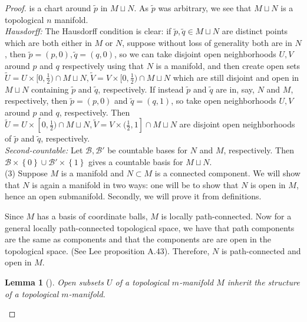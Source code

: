 \documentclass[reqno]{amsart}
\newtheorem{lemma}[theorem]{Lemma}
\theoremstyle{definition}
\theoremstyle{remark}
\begin{document}
\begin{proof}
is a chart around $\tilde{p}$ in
$M \sqcup N$. As $\tilde{p}$ was arbitrary,
we see that $M \sqcup N$ is a topological
$n$ manifold.\\
\linebreak
\textit{Hausdorff:} The Hausdorff condition is
clear: if $\tilde{p}, \tilde{q} \in M \sqcup N$ are distinct
points which are
both either in  $M$ or $N$, suppose without loss of generality
both are in $N$, then $\tilde{p} = \left( p,0 \right) ,
\tilde{q} = \left( q,0 \right) $, so we can take
disjoint open neighborhoods $U,V$ around
$p$ and $q$ respectively using that $N$ is a manifold,
and then create open sets
$\tilde{U} = U \times [0,\frac{1}{2}) \cap
M \sqcup N,
\tilde{V} = V \times [0, \frac{1}{2})
\cap M \sqcup N$ which are still
disjoint and open in $M \sqcup N$ containing
$\tilde{p}$ and $\tilde{q}$, respectively.
If instead $\tilde{p}$ and $\tilde{q}$ are in, say,
$N$ and $M$, respectively, then
$\tilde{p} = \left( p,0 \right) $ and
$\tilde{q} = \left( q,1 \right) $, so
take open neighborhoods $U,V$ around $p$ and $q$, respectively.
Then
$\tilde{U} = U \times [0, \frac{1}{2}) \cap
M \sqcup N,
\tilde{V} = V \times (\frac{1}{2},1] \cap
M \sqcup N$  are disjoint open neighborhoods
of $\tilde{p}$ and $\tilde{q}$, respectively.\\
\linebreak
\textit{Second-countable:}
Let $\mathcal{B}, \mathcal{B}'$ be countable bases for
$N$ and $M$, respectively. Then
$\mathcal{B} \times \left\{ 0 \right\} \cup 
\mathcal{B}' \times \left\{ 1 \right\} $ gives
a countable basis for $M \sqcup N$.\\
\linebreak
(3) Suppose $M$ is a manifold and
$N \subset M$ is a connected component. 
We will show that $N$ is again a manifold in two ways: one
will be to show that $N$ is open in $M$, hence an open
submanifold. Secondly, we will prove it from definitions.\\
\linebreak

Since $M$ has a basis of coordinate balls,
$M$ is locally path-connected. Now for a general
locally path-connected topological space, we have
that path components are the same as components and
that the components are
are open in the topological space. (See Lee proposition
A.43). 
Therefore, $N$ is path-connected and open in
$M$.

\begin{lemma}[]
    Open subsets $U$ of a topological $m$-manifold
    $M$ inherit the structure of a topological
    $m$-manifold.
\end{lemma}


\end{proof}
\end{document}
